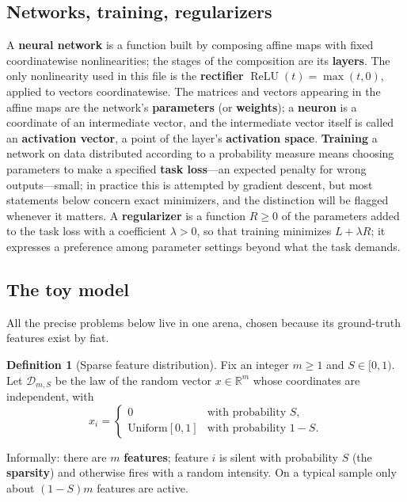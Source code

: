 \documentclass[11pt]{amsart}
\theoremstyle{plain}
\theoremstyle{definition}
\newtheorem{definition}[theorem]{Definition}
\DeclareMathOperator{\relu}{ReLU}
\newcommand{\R}{\mathbb{R}}
\begin{document}
\subsection{Networks, training, regularizers}

A \textbf{neural network} is a function built by composing affine maps with fixed coordinatewise nonlinearities; the stages of the composition are its \textbf{layers}. The only nonlinearity used in this file is the \textbf{rectifier} $\relu(t)=\max(t,0)$, applied to vectors coordinatewise. The matrices and vectors appearing in the affine maps are the network's \textbf{parameters} (or \textbf{weights}); a \textbf{neuron} is a coordinate of an intermediate vector, and the intermediate vector itself is called an \textbf{activation vector}, a point of the layer's \textbf{activation space}. \textbf{Training} a network on data distributed according to a probability measure means choosing parameters to make a specified \textbf{task loss}---an expected penalty for wrong outputs---small; in practice this is attempted by gradient descent, but most statements below concern exact minimizers, and the distinction will be flagged whenever it matters. A \textbf{regularizer} is a function $R\ge 0$ of the parameters added to the task loss with a coefficient $\lambda>0$, so that training minimizes $L+\lambda R$; it expresses a preference among parameter settings beyond what the task demands.

\subsection{The toy model}

All the precise problems below live in one arena, chosen because its ground-truth features exist by fiat.

\begin{definition}[Sparse feature distribution]\label{def:data}
Fix an integer $m\ge 1$ and $S\in[0,1)$. Let $\mathcal D_{m,S}$ be the law of the random vector $x\in\R^m$ whose coordinates are independent, with
\[
x_i = \begin{cases} 0 & \text{with probability } S,\\ \text{Uniform}[0,1] & \text{with probability } 1-S.\end{cases}
\]
\end{definition}

Informally: there are $m$ \textbf{features}; feature $i$ is silent with probability $S$ (the \textbf{sparsity}) and otherwise fires with a random intensity. On a typical sample only about $(1-S)m$ features are active.
\end{document}
